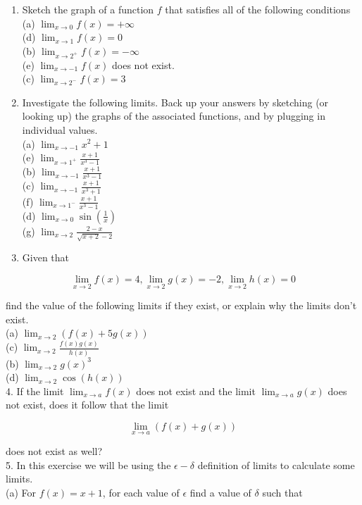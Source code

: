 \documentclass[10pt]{article}
\begin{document}
\begin{enumerate}
  \item Sketch the graph of a function $f$ that satisfies all of the following conditions\\
(a) $\lim _{x \rightarrow 0} f(x)=+\infty$\\
(d) $\lim _{x \rightarrow 1} f(x)=0$\\
(b) $\lim _{x \rightarrow 2^{+}} f(x)=-\infty$\\
(e) $\lim _{x \rightarrow-1} f(x)$ does not exist.\\
(c) $\lim _{x \rightarrow 2^{-}} f(x)=3$
  \item Investigate the following limits. Back up your answers by sketching (or looking up) the graphs of the associated functions, and by plugging in individual values.\\
(a) $\lim _{x \rightarrow-1} x^{2}+1$\\
(e) $\lim _{x \rightarrow 1^{+}} \frac{x+1}{x^{3}-1}$\\
(b) $\lim _{x \rightarrow-1} \frac{x+1}{x^{3}-1}$\\
(c) $\lim _{x \rightarrow-1} \frac{x+1}{x^{3}+1}$\\
(f) $\lim _{x \rightarrow 1^{-}} \frac{x+1}{x^{3}-1}$\\
(d) $\lim _{x \rightarrow 0} \sin \left(\frac{1}{x}\right)$\\
(g) $\lim _{x \rightarrow 2} \frac{2-x}{\sqrt{x+2}-2}$
  \item Given that
\end{enumerate}

$$
\lim _{x \rightarrow 2} f(x)=4, \lim _{x \rightarrow 2} g(x)=-2, \lim _{x \rightarrow 2} h(x)=0
$$

find the value of the following limits if they exist, or explain why the limits don't exist.\\
(a) $\lim _{x \rightarrow 2}(f(x)+5 g(x))$\\
(c) $\lim _{x \rightarrow 2} \frac{f(x) g(x)}{h(x)}$\\
(b) $\lim _{x \rightarrow 2} g(x)^{3}$\\
(d) $\lim _{x \rightarrow 2} \cos (h(x))$\\
4. If the limit $\lim _{x \rightarrow a} f(x)$ does not exist and the limit $\lim _{x \rightarrow a} g(x)$ does not exist, does it follow that the limit

$$
\lim _{x \rightarrow a}(f(x)+g(x))
$$

does not exist as well?\\
5. In this exercise we will be using the $\epsilon-\delta$ definition of limits to calculate some limits.\\
(a) For $f(x)=x+1$, for each value of $\epsilon$ find a value of $\delta$ such that
\end{document}
